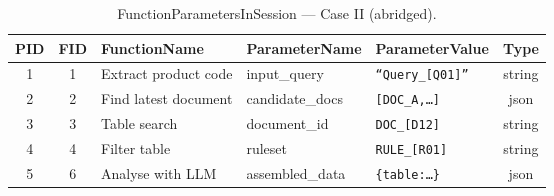 \begin{table}[H]
\captionsetup{width=0.92\linewidth, skip=1pt}
    \caption{FunctionParametersInSession — Case II (abridged).}
    \label{tab:saab_parameter_excerpt}
    \centering
    \small
    \setlength{\tabcolsep}{5pt}
    \renewcommand{\arraystretch}{1}
    \begin{tabularx}{\linewidth}{@{}c c p{3.5cm} p{3cm} X c@{}}
    \toprule
    \textbf{PID} &
    \textbf{FID} &
    \textbf{FunctionName} &
    \textbf{ParameterName} &
    \textbf{ParameterValue} &
    \textbf{Type} \\
    \midrule
    1 & 1 & Extract product code & input\_query & \texttt{``Query\_[Q01]''} & string \\
    2 & 2 & Find latest document & candidate\_docs & \texttt{[DOC\_A,\dots]} & json \\
    3 & 3 & Table search & document\_id & \texttt{DOC\_[D12]} & string \\
    4 & 4 & Filter table & ruleset & \texttt{RULE\_[R01]} & string \\
    5 & 6 & Analyse with LLM & assembled\_data & \texttt{\{table:\dots\}} & json \\
    \bottomrule
    \end{tabularx}
\end{table}


